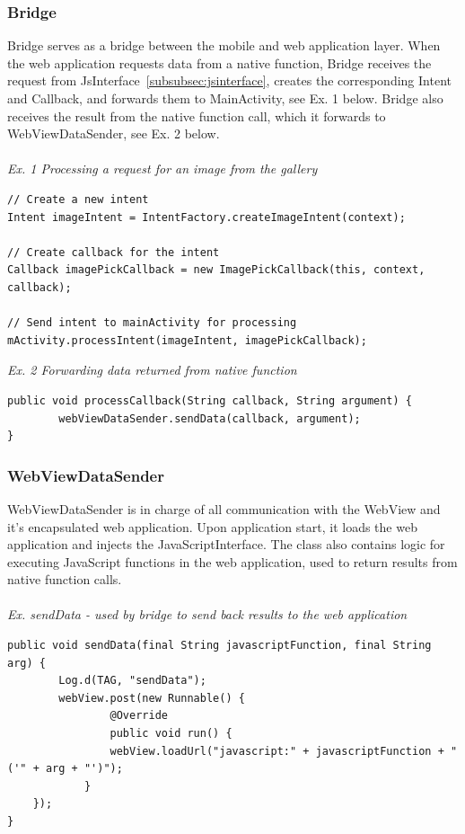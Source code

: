 \subsubsection{Bridge} 
Bridge serves as a bridge between the mobile and web application layer. When the web application requests data from a native function, Bridge receives the request from JsInterface~\ref{subsubsec:jsinterface}, creates the corresponding Intent and Callback, and forwards them to MainActivity, see Ex. 1 below. Bridge also receives the result from the native function call, which it forwards to WebViewDataSender, see Ex. 2 below.
\\\\
\emph{Ex. 1 Processing a request for an image from the gallery}
\begin{lstlisting}
// Create a new intent
Intent imageIntent = IntentFactory.createImageIntent(context);

// Create callback for the intent
Callback imagePickCallback = new ImagePickCallback(this, context, callback);

// Send intent to mainActivity for processing
mActivity.processIntent(imageIntent, imagePickCallback);
\end{lstlisting}

\emph{Ex. 2 Forwarding data returned from native function}
\begin{lstlisting}
public void processCallback(String callback, String argument) {
        webViewDataSender.sendData(callback, argument);
}
\end{lstlisting}
	
\subsubsection{WebViewDataSender}
WebViewDataSender is in charge of all communication with the WebView and it's encapsulated web application. Upon application start, it loads the web application and injects the JavaScriptInterface. The class also contains logic for executing JavaScript functions in the web application, used to return results from native function calls.
\\\\
\emph{Ex. sendData - used by bridge to send back results to the web application}
\begin{lstlisting}
public void sendData(final String javascriptFunction, final String arg) {
        Log.d(TAG, "sendData");
        webView.post(new Runnable() {
            	@Override
            	public void run() {
        		webView.loadUrl("javascript:" + javascriptFunction + "('" + arg + "')");
    		}
	});
}
\end{lstlisting}
	
